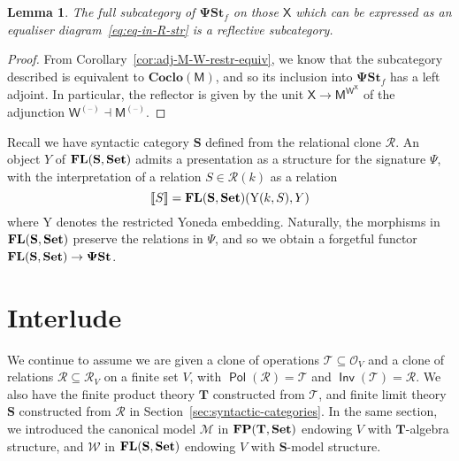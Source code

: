 \documentclass[11pt, a4paper, twoside,leqno]{amsart}
\newcommand{\cat}[1]{\mathbf{#1}}
\newcommand{\thg}{{\mathord{\text{--}}}}
\newcommand{\dbr}[1]{\left\llbracket{#1}\right\rrbracket}
\renewcommand{\O}{{\mathcal O}}
\newcommand{\R}{{\mathcal R}}
\numberwithin{equation}{section}
\theoremstyle{plain}
\newtheorem{Lemma}[Thm]{Lemma}
\theoremstyle{definition}
\newcommand{\Set}{\cat{Set}}
\DeclareMathOperator{\FP}{\bf FP}
\DeclareMathOperator{\FL}{\bf FL}
\DeclareMathOperator{\Pol}{\mathsf{Pol}}
\DeclareMathOperator{\Inv}{\mathsf{Inv}}
\newcommand{\yo}{\text{\usefont{U}{min}{m}{n}\symbol{'210}}}
\begin{document}
\begin{Lemma}
  \label{lem:33}
  The full subcategory of \(\cat{\Psi St}_{f}\) on
  those $\mathsf{X}$ which can be expressed as an equaliser
  diagram~\eqref{eq:eq-in-R-str} is a reflective subcategory.
\end{Lemma}

\begin{proof}
  From Corollary~\ref{cor:adj-M-W-restr-equiv}, we know that the
  subcategory described
  is equivalent to \(\cat{Coclo}(\mathsf{M})\),
  and so its inclusion into \(\cat{\Psi St}_{f}\) has a left adjoint. In
  particular, the reflector is given by the unit $\mathsf{X}
  \rightarrow \mathsf{M}^{\mathsf{W}^{\mathsf{X}}}$ of the adjunction
  $\mathsf{W}^{(\thg)} \dashv \mathsf{M}^{(\thg)}$.
\end{proof}


Recall we have syntactic category \(\cat{S}\) defined from the
relational clone \(\mathscr{R}\). An object \(Y\) of
\(\FL(\cat{S},\Set)\) admits a presentation as
a structure for the signature \(\Psi\), with the interpretation of a
relation \(S \in \mathscr{R}(k)
\) as a relation
\begin{equation*}
  \dbr{S} =
  \FL(\cat{S},\Set)(\mathrm{Y}
  (k,S),Y)
\end{equation*}
where \(\mathrm{Y}
\) denotes
the restricted Yoneda embedding. Naturally, the morphisms in
\(\FL(\cat{S},\Set)\) preserve the relations in
\(\Psi\), and so we obtain a forgetful functor \(\FL(\cat{S},\Set)
\rightarrow \cat{\Psi St}\).


\section{Interlude}
\label{sec:interlude}

We continue to assume we are given a clone of operations \(\mathscr{T}
\subseteq \O_{V}\) and a clone of
relations \(\mathscr{R}
\subseteq \R_{V}\) on a finite set \(V\), with  \(\Pol(\mathscr{R}
) = \mathscr{T}
\) and \(\Inv(\mathscr{T}
) = \mathscr{R}
\). We also have the finite product theory
\(\cat{T}\) constructed from \(\mathscr{T}
\), and finite limit theory \(\cat{S}\) constructed from
\(\mathscr{R}\) in Section~\ref{sec:syntactic-categories}. In the
same section, we introduced the canonical model \(\mathcal{M}\) in
\(\FP(\cat{T},\Set)\) endowing \(V\) with \(\cat{T}\)-algebra
structure, and \(\mathcal{W}\) in \(\FL(\cat{S}, \cat{Set})\) endowing \(V\) with \(\cat{S}\)-model
structure.
\end{document}
